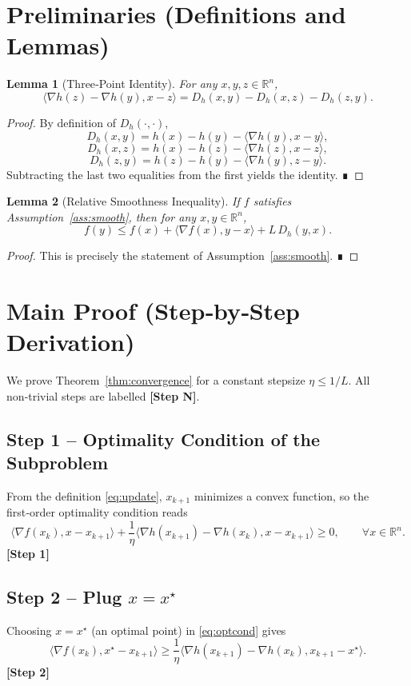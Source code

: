 \documentclass{article}
\newtheorem{lemma}{Lemma}
\newcommand{\grad}{\nabla}
\newcommand{\inner}[2]{\langle #1,#2\rangle}
\newcommand{\Breg}[2]{D_h(#1,#2)}
\newcommand{\R}{\mathbb{R}}
\begin{document}
\newpage
\section*{Preliminaries (Definitions and Lemmas)}
\begin{lemma}[Three‑Point Identity]
\label{lem:threepoint}
For any $x,y,z\in\R^n$,
\[
\inner{\grad h(z)-\grad h(y)}{x-z}= \Breg{x}{y}-\Breg{x}{z}-\Breg{z}{y}.
\]
\end{lemma}
\begin{proof}
By definition of $\Breg{\cdot}{\cdot}$,
\[
\Breg{x}{y}=h(x)-h(y)-\inner{\grad h(y)}{x-y},
\]
\[
\Breg{x}{z}=h(x)-h(z)-\inner{\grad h(z)}{x-z},
\]
\[
\Breg{z}{y}=h(z)-h(y)-\inner{\grad h(y)}{z-y}.
\]
Subtracting the last two equalities from the first yields the identity. ∎
\end{proof}

\begin{lemma}[Relative Smoothness Inequality]
\label{lem:relSmooth}
If $f$ satisfies Assumption~\ref{ass:smooth}, then for any $x,y\in\R^n$,
\[
f(y)\le f(x)+\inner{\grad f(x)}{y-x}+L\,\Breg{y}{x}.
\]
\end{lemma}
\begin{proof}
This is precisely the statement of Assumption~\ref{ass:smooth}. ∎
\end{proof}

\section*{Main Proof (Step‑by‑Step Derivation)}
We prove Theorem~\ref{thm:convergence} for a constant stepsize $\eta\le 1/L$.  
All non‑trivial steps are labelled \textbf{[Step N]}.

\subsection*{Step 1 – Optimality Condition of the Subproblem}
From the definition \eqref{eq:update}, $x_{k+1}$ minimizes a convex function, so the first‑order optimality condition reads
\begin{equation}
\label{eq:optcond}
\inner{\grad f(x_k)}{x-x_{k+1}}+\frac{1}{\eta}\inner{\grad h(x_{k+1})-\grad h(x_k)}{x-x_{k+1}}\ge 0,\qquad\forall x\in\R^n.
\end{equation}
\textbf{[Step 1]}

\subsection*{Step 2 – Plug $x=x^{\star}$}
Choosing $x=x^{\star}$ (an optimal point) in \eqref{eq:optcond} gives
\begin{equation}
\label{eq:optstar}
\inner{\grad f(x_k)}{x^{\star}-x_{k+1}}
\ge \frac{1}{\eta}\inner{\grad h(x_{k+1})-\grad h(x_k)}{x_{k+1}-x^{\star}}.
\end{equation}
\textbf{[Step 2]}
\end{document}
